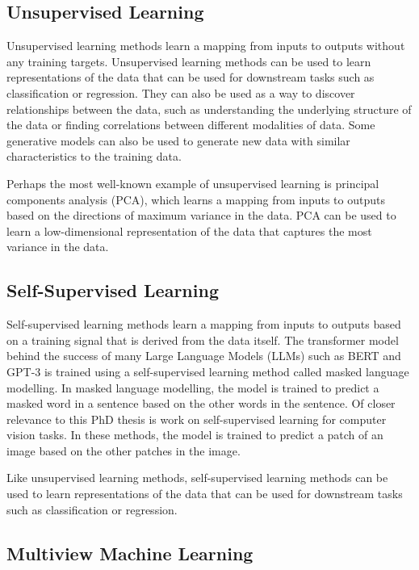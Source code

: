 \subsection{Unsupervised Learning}

Unsupervised learning methods learn a mapping from inputs to outputs without any training targets.
Unsupervised learning methods can be used to learn representations of the data that can be used for downstream tasks such as classification or regression.
They can also be used as a way to discover relationships between the data, such as understanding the underlying structure of the data or finding correlations between different modalities of data.
Some generative models can also be used to generate new data with similar characteristics to the training data.

Perhaps the most well-known example of unsupervised learning is principal components analysis (PCA), which learns a mapping from inputs to outputs based on the directions of maximum variance in the data.
PCA can be used to learn a low-dimensional representation of the data that captures the most variance in the data.

\subsection{Self-Supervised Learning}

Self-supervised learning methods learn a mapping from inputs to outputs based on a training signal that is derived from the data itself.
The transformer model behind the success of many Large Language Models (LLMs) such as BERT \cite{devlin2018bert} and GPT-3 \cite{brown2020language} is trained using a self-supervised learning method called masked language modelling.
In masked language modelling, the model is trained to predict a masked word in a sentence based on the other words in the sentence.
Of closer relevance to this PhD thesis is work on self-supervised learning for computer vision tasks.
In these methods, the model is trained to predict a patch of an image based on the other patches in the image.

Like unsupervised learning methods, self-supervised learning methods can be used to learn representations of the data that can be used for downstream tasks such as classification or regression.

\subsection{Multiview Machine Learning}

